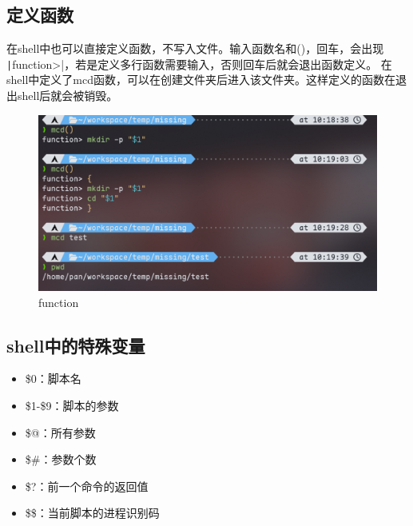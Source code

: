 \documentclass[fontset=ubuntu]{ctexart}
\begin{document}
\begin{sloppypar}
\subsection{定义函数}
在shell中也可以直接定义函数，不写入文件。输入函数名和()，回车，会出现
\texttt|function>|，若是定义多行函数需要输入{}，否则回车后就会退出函数定义。
在shell中定义了mcd函数，可以在创建文件夹后进入该文件夹。这样定义的函数在退出shell后就会被销毁。
\begin{figure}[htb]
    \centering
    \includegraphics[width=0.75\linewidth]{Function.png}
    \caption{function}
    \label{fig:function}
\end{figure}

\subsection{shell中的特殊变量}
\begin{itemize}
    \item \$0：脚本名
    \item \$1-\$9：脚本的参数
    \item \$@：所有参数
    \item \$\#：参数个数
    \item \$?：前一个命令的返回值
    \item \$\$：当前脚本的进程识别码
\end{itemize}


\end{sloppypar}
\end{document}
